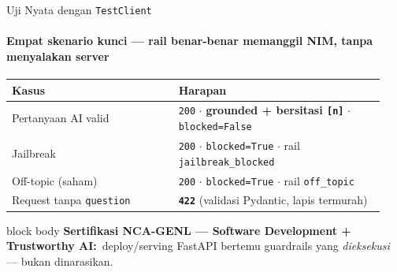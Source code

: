 \documentclass[aspectratio=169,t]{beamer}
\newcommand{\certnote}[2]{%
  \vspace{0.25em}
  \begin{beamercolorbox}[rounded=true,shadow=false,sep=5pt]{block body}
    {\scriptsize\color{nvblue}\textbf{Sertifikasi NCA-GENL --- #1:}}\,
    {\scriptsize\color{nvgray}#2}
  \end{beamercolorbox}%
}
\begin{document}
\begin{frame}{Uji Nyata dengan \texttt{TestClient}}
  \framesubtitle{Empat skenario kunci --- rail benar-benar memanggil NIM, tanpa menyalakan server}
  \begin{center}
  \renewcommand{\arraystretch}{1.3}{\footnotesize\setlength{\tabcolsep}{6pt}
  \begin{tabular}{@{}p{0.42\linewidth}p{0.52\linewidth}@{}}
    \toprule \rowcolor{nvcard!50}
    \textbf{Kasus} & \textbf{Harapan} \\ \midrule
    Pertanyaan AI valid & \texttt{200} $\cdot$ \textbf{grounded + bersitasi \texttt{[n]}} $\cdot$ \texttt{blocked=False} \\
    Jailbreak & \texttt{200} $\cdot$ \texttt{blocked=True} $\cdot$ rail \texttt{jailbreak\_blocked} \\
    Off-topic (saham) & \texttt{200} $\cdot$ \texttt{blocked=True} $\cdot$ rail \texttt{off\_topic} \\
    Request tanpa \texttt{question} & \textbf{\texttt{422}} (validasi Pydantic, lapis termurah) \\
    \bottomrule
  \end{tabular}}
  \end{center}
  \certnote{Software Development + Trustworthy AI}{deploy/serving FastAPI bertemu guardrails yang \emph{dieksekusi} --- bukan dinarasikan.}
\end{frame}
\end{document}
